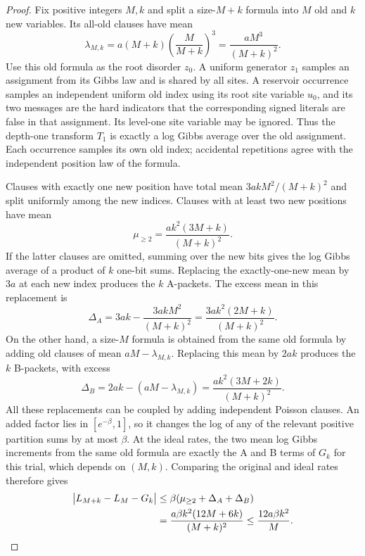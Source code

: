 \begin{proof}
Fix positive integers $M,k$ and split a size-$M+k$ formula into $M$ old and
$k$ new variables.  Its all-old clauses have mean
\begin{equation}
 \lambda_{M,k}=a(M+k)\left(\frac{M}{M+k}\right)^3
              =\frac{aM^3}{(M+k)^2}.
 \label{ctr:old-rate}
\end{equation}
Use this old formula as the root disorder $z_0$.  A uniform generator $z_1$
samples an assignment from its Gibbs law and is shared by all sites.  A
reservoir occurrence samples an independent uniform old index using its
root site variable $u_0$, and its two messages are the hard indicators that
the corresponding signed literals are false in that assignment.  Its
level-one site variable may be ignored.  Thus the depth-one transform $T_1$
is exactly a log Gibbs average over the old assignment.  Each occurrence
samples its own old index; accidental repetitions agree with the independent
position law of the formula.

Clauses with exactly one new position have total mean
$3akM^2/(M+k)^2$ and split uniformly among the new indices.  Clauses with
at least two new positions have mean
\[
 \mu_{\ge2}=\frac{ak^2(3M+k)}{(M+k)^2}.
\]
If the latter clauses are omitted, summing over the new bits gives the log
Gibbs average of a product of $k$ one-bit sums.  Replacing the exactly-one-new
mean by $3a$ at each new index produces the $k$ A-packets.  The excess mean
in this replacement is
\[
 \Delta_A=3ak-\frac{3akM^2}{(M+k)^2}
         =\frac{3ak^2(2M+k)}{(M+k)^2}.
\]
On the other hand, a size-$M$ formula is obtained from the same old formula
by adding old clauses of mean $aM-\lambda_{M,k}$.  Replacing this mean by
$2ak$ produces the $k$ B-packets, with excess
\[
 \Delta_B=2ak-(aM-\lambda_{M,k})
         =\frac{ak^2(3M+2k)}{(M+k)^2}.
\]
All these replacements can be coupled by adding independent Poisson
clauses.  An added factor lies in $[e^{-\beta},1]$, so it changes the log of
any of the relevant positive partition sums by at most $\beta$.  At the ideal
rates, the two mean log Gibbs increments from the same old formula are exactly
the A and B terms of $G_k$ for this trial, which depends on $(M,k)$.  Comparing
the original and ideal rates therefore gives
\begin{align}
 \bigl|L_{M+k}-L_M-G_k\bigr|
 &\le\beta(\mu_{\ge2}+\Delta_A+\Delta_B) \notag\\
 &=\frac{a\beta k^2(12M+6k)}{(M+k)^2}
 \le\frac{12a\beta k^2}{M}.
 \label{ctr:reservoir-increment}
\end{align}


\end{proof}
